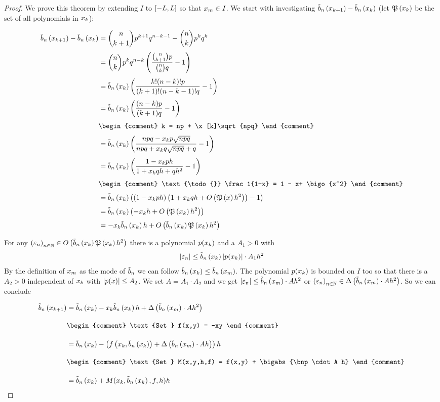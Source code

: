 \begin{proof}
  We prove this theorem by extending $I$ to $\interval{-L}{L}$  so that $\xnp \in I$. We start with investigating $\bb{\x[k+1]}-\bb{\x[k]}$ (let $\pol{\x}$ be the set of all polynomials in $\x$):

  \begin{align}
    \bb{\x[k+1]} - \bb{\x[k]} &= \binom n{k+1} p^{k+1}q^{n-k-1} - \binom nk p^k q^k \nl
    &= \binom nk p^k q^{n-k} \br{\frac{\binom n{k+1}p}{\binom nk q} -1} \nl
    &= \bb{\x[k]} \br{\frac{k! (n-k)! p}{(k+1)!(n-k-1)! q} -1} \nl
    &= \bb{\x[k]} \br{\frac{(n-k)p}{(k+1)q}-1} \nl
    &
    \begin{comment}
      k = np + \x[k]\sqrt{npq}
    \end{comment} \nl
    &= \bb{\x[k]} \br{\frac{npq-\x[k]p\sqrt{npq}}{npq + \x[k]q\sqrt{npq}+q}-1} \nl
    &= \bb{\x[k]} \br{\frac{1-\x[k]ph}{1+\x[k]qh+qh^2}-1} \nl
    &
    \begin{comment}
      \text{\todo{}} \frac1{1+x} = 1 - x+ \bigo{x^2}
    \end{comment} \nl
    &= \bb{\x[k]} \br{\br{1-\x[k]ph}\br{1+\x[k]qh + \bigo{\pol{x}h^2}}-1} \nl
    &= \bb{\x[k]} \br{-\x[k]h + \bigo{\pol{\x}h^2}} \nl
    &= -\x[k]\bb{\x}h +  \bigo{\bb{\x[k]}\pol{\x}h^2}
  \end{align}

  For any $\seq{\epsilon_n} \in \bigo{\bb{\x[k]}\pol{\x[k]}h^2}$ there is a polynomial $p(\x[k])$ and a $A_1 > 0$ with
  \begin{align}
    \abs{\epsilon_n} \le \bb{\x[k]} \abs{p(\x[k])} \cdot A_1 h^2
  \end{align}
  By the definition of $\xnp$ as the mode of $\bbs$ we can follow $\bb{\x[k]} \le \bnp$. The polynomial $p(\x)$ is bounded on $I$ too so that there is a $A_2>0$ independent of $\x$ with $\abs{p(x)} \le A_2$. We set $A=A_1\cdot A_2$ and we get $\abs{\epsilon_n} \le \bnp \cdot A h^2$ or $\seq{\epsilon_n}\in \bigabs{\bnp \cdot A h^2}$. So we can conclude

  \begin{align}
    \bb{\x[k+1]} &= \bb{\x[k]} -\x[k]\bb{\x[k]} h + \bigabs{\bnp \cdot A h^2}\bnl
    &
    \begin{comment}
      \text{Set } f(x,y) = -xy
    \end{comment} \bnl
    &= \bb{\x[k]} - \br{\f{\x[k], \bb{\x[k]}} + \bigabs{\bnp \cdot A h}}h \bnl
    &
    \begin{comment}
      \text{Set } M(x,y,h,f) = f(x,y) + \bigabs{\bnp \cdot A h}
    \end{comment} \bnl
    &= \bb{\x[k]} + M(\x[k], \bb{\x[k]}, f, h) h
  \end{align}


\end{proof}
